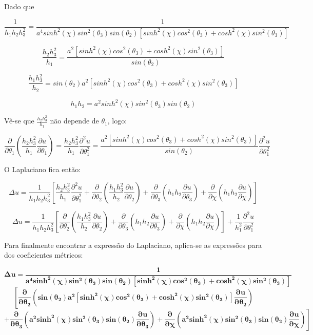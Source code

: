\documentclass[12pt, a4papper]{article}
\begin{document}
Dado que

\[
\frac{1}{h_{1}h_{2}h_{3}^{2}}=\frac{1}{a^{4}sinh^{2}(\chi)sin^{2}(\theta_{3})sin(\theta_{2})\left[sinh^{2}(\chi)cos^{2}(\theta_{3})+cosh^{2}(\chi)sin^{2}(\theta_{3})\right]}
\]

\[
\frac{h_{2}h_{3}^{2}}{h_{1}}=\frac{a^{2}\left[sinh^{2}(\chi)cos^{2}(\theta_{3})+cosh^{2}(\chi)sin^{2}(\theta_{3})\right]}{sin(\theta_{2})}
\]

\[
\frac{h_{1}h_{3}^{2}}{h_{2}}=sin(\theta_{2})a^{2}\left[sinh^{2}(\chi)cos^{2}(\theta_{3})+cosh^{2}(\chi)sin^{2}(\theta_{3})\right]
\]

\[
h_{1}h_{2}=a^{2}sinh^{2}(\chi)sin^{2}(\theta_{3})sin(\theta_{2})
\]

Vê-se que $\frac{h_{2}h_{3}^{2}}{h_{1}}$ não depende de $\theta_{1}$,
logo:

\[
\frac{\partial}{\partial\theta_{1}}\left(\frac{h_{2}h_{3}^{2}}{h_{1}}\frac{\partial u}{\partial\theta_{1}}\right)=\frac{h_{2}h_{3}^{2}}{h_{1}}\frac{\partial^{2}u}{\partial\theta_{1}^{2}}=\frac{a^{2}\left[sinh^{2}(\chi)cos^{2}(\theta_{3})+cosh^{2}(\chi)sin^{2}(\theta_{3})\right]}{sin(\theta_{2})}\frac{\partial^{2}u}{\partial\theta_{1}^{2}}
\]

O Laplaciano fica então:

\[
\Delta u=\frac{1}{h_{1}h_{2}h_{3}^{2}}\left[\frac{h_{2}h_{3}^{2}}{h_{1}}\frac{\partial^{2}u}{\partial\theta_{1}^{2}}+\frac{\partial}{\partial\theta_{2}}\left(\frac{h_{1}h_{3}^{2}}{h_{2}}\frac{\partial u}{\partial\theta_{2}}\right)+\frac{\partial}{\partial\theta_{3}}\left(h_{1}h_{2}\frac{\partial u}{\partial\theta_{3}}\right)+\frac{\partial}{\partial\chi}\left(h_{1}h_{2}\frac{\partial u}{\partial\chi}\right)\right]
\]

\[
\Delta u=\frac{1}{h_{1}h_{2}h_{3}^{2}}\left[\frac{\partial}{\partial\theta_{2}}\left(\frac{h_{1}h_{3}^{2}}{h_{2}}\frac{\partial u}{\partial\theta_{2}}\right)+\frac{\partial}{\partial\theta_{3}}\left(h_{1}h_{2}\frac{\partial u}{\partial\theta_{3}}\right)+\frac{\partial}{\partial\chi}\left(h_{1}h_{2}\frac{\partial u}{\partial\chi}\right)\right]+\frac{1}{h_{1}^{2}}\frac{\partial^{2}u}{\partial\theta_{1}^{2}}
\]

Para finalmente encontrar a expressão do Laplaciano, aplica-se as
expressões para dos coeficientes métricos:

\[
\boldsymbol{\Delta u=\frac{1}{a^{4}sinh^{2}(\chi)sin^{2}(\theta_{3})sin(\theta_{2})\left[sinh^{2}(\chi)cos^{2}(\theta_{3})+cosh^{2}(\chi)sin^{2}(\theta_{3})\right]}}
\]
\[ \boldsymbol{\left[\frac{\partial}{\partial\theta_{2}}\left(sin(\theta_{2})a^{2}\left[sinh^{2}(\chi)cos^{2}(\theta_{3})+cosh^{2}(\chi)sin^{2}(\theta_{3})\right]\frac{\partial u}{\partial\theta_{2}}\right) \right.}\]
\[
\boldsymbol{\left. +\frac{\partial}{\partial\theta_{3}}\left(a^{2}sinh^{2}(\chi)sin^{2}(\theta_{3})sin(\theta_{2})\frac{\partial u}{\partial\theta_{3}}\right)+\frac{\partial}{\partial\chi}\left(a^{2}sinh^{2}(\chi)sin^{2}(\theta_{3})sin(\theta_{2})\frac{\partial u}{\partial\chi}\right)\right]}
\]
\end{document}
